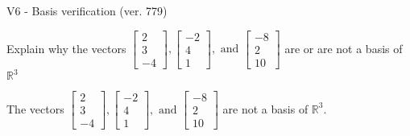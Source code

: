 \begin{exercise}
  \begin{exerciseTitle}V6 - Basis verification (ver. 779)\end{exerciseTitle}
  \begin{exerciseStatement}
    Explain why the vectors \(\left[\begin{array}{r}
2 \\
3 \\
-4
\end{array}\right] , \left[\begin{array}{r}
-2 \\
4 \\
1
\end{array}\right] , \text{ and } \left[\begin{array}{r}
-8 \\
2 \\
10
\end{array}\right]\) are or are not a basis of \(\mathbb{R}^3\)	


  \end{exerciseStatement}
  \begin{exerciseAnswer}
   The vectors \(\left[\begin{array}{r}
2 \\
3 \\
-4
\end{array}\right] , \left[\begin{array}{r}
-2 \\
4 \\
1
\end{array}\right] , \text{ and } \left[\begin{array}{r}
-8 \\
2 \\
10
\end{array}\right]\) 
  	 are not  a basis of \(\mathbb{R}^3\).
  


  \end{exerciseAnswer}
\end{exercise}